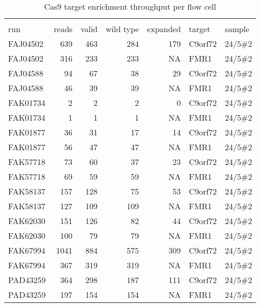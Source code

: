 \setlength\LTleft{0pt}
\setlength\LTright{0pt}
\begin{longtable}{lrrrrll}
\caption[Cas9 target enrichment throughput per flow cell]{Cas9 target enrichment throughput per flow cell} \\
\label{tab:strique:Cas9} \\
run      & reads & valid & wild type & expanded & target  & sample  \\
\hline
FAJ04502 & 639   & 463   & 284       & 179      & C9orf72 & 24/5\#2 \\
FAJ04502 & 316   & 233   & 233       & NA       & FMR1    & 24/5\#2 \\
FAJ04588 & 94    & 67    & 38        & 29       & C9orf72 & 24/5\#2 \\
FAJ04588 & 46    & 39    & 39        & NA       & FMR1    & 24/5\#2 \\
FAK01734 & 2     & 2     & 2         & 0        & C9orf72 & 24/5\#2 \\
FAK01734 & 1     & 1     & 1         & NA       & FMR1    & 24/5\#2 \\
FAK01877 & 36    & 31    & 17        & 14       & C9orf72 & 24/5\#2 \\
FAK01877 & 56    & 47    & 47        & NA       & FMR1    & 24/5\#2 \\
FAK57718 & 73    & 60    & 37        & 23       & C9orf72 & 24/5\#2 \\
FAK57718 & 69    & 59    & 59        & NA       & FMR1    & 24/5\#2 \\
FAK58137 & 157   & 128   & 75        & 53       & C9orf72 & 24/5\#2 \\
FAK58137 & 127   & 109   & 109       & NA       & FMR1    & 24/5\#2 \\
FAK62030 & 151   & 126   & 82        & 44       & C9orf72 & 24/5\#2 \\
FAK62030 & 100   & 79    & 79        & NA       & FMR1    & 24/5\#2 \\
FAK67994 & 1041  & 884   & 575       & 309      & C9orf72 & 24/5\#2 \\
FAK67994 & 367   & 319   & 319       & NA       & FMR1    & 24/5\#2 \\
PAD43259 & 364   & 298   & 187       & 111      & C9orf72 & 24/5\#2 \\
PAD43259 & 197   & 154   & 154       & NA       & FMR1    & 24/5\#2
\end{longtable}

